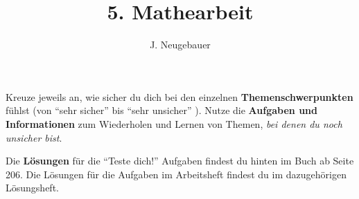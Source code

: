 \documentclass[11pt, a4paper]{scrartcl}
\author{J. Neugebauer}
\title{5. Mathearbeit}
\date{\Heute}
\begin{document}
\CheckupBild\CheckupTitel

Kreuze jeweils an, wie sicher du dich bei den einzelnen \textbf{Themenschwerpunkten} fühlst (von \enquote{sehr sicher}  bis \enquote{sehr unsicher} ). Nutze die \textbf{Aufgaben und Informationen} zum Wiederholen und Lernen von Themen, \emph{bei denen du noch unsicher bist}.

Die \textbf{Lösungen} für die \enquote{Teste dich!} Aufgaben findest du hinten im Buch ab Seite 206. Die Lösungen für die Aufgaben im Arbeitsheft findest du im dazugehörigen Lösungsheft.

\begin{checkup}
\end{checkup}
\end{document}
